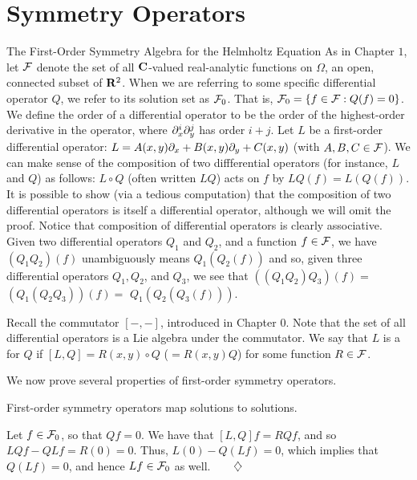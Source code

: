 \chapter{Symmetry Operators}

\begin{section}{The First-Order Symmetry Algebra for the Helmholtz Equation}
As in Chapter $1$, let $\mathcal{F}$ denote the set of all $\mathbf{C}$-valued real-analytic functions on $\Omega$, an open, connected subset of $\mathbf{R}^2$.  When we are referring to some specific differential operator $Q$, we refer to its solution set as $\mathcal{F}_0$.  That is, $\mathcal{F}_0 = \{ f \in \mathcal{F}: Q(f) = 0 \}$.  We define the order of a differential operator to be the order of the highest-order derivative in the operator, where $\partial_{x}^i \partial_{y}^j$ has order $i + j$.  Let $L$ be a first-order differential operator: $L = A(x,y) \partial_{x} + B(x,y) \partial_{y} + C(x,y)$ (with $A, B, C \in \mathcal{F}$).  We can make sense of the composition of two diffferential operators (for instance, $L$ and $Q$) as follows: $L \circ Q$ (often written $LQ$) acts on $f$ by $LQ(f) = L(Q(f))$.  It is possible to show (via a tedious computation) that the composition of two differential operators is itself a differential operator, although we will omit the proof.  Notice that composition of differential operators is clearly associative.  Given two differential operators $Q_1$ and $Q_2$, and a function $f \in \mathcal{F}$, we have $\left( Q_1 Q_2 \right) (f)$ unambiguously means $Q_1 \left( Q_2 (f) \right)$ and so, given three differential operators $Q_1, Q_2$, and $Q_3$, we see that $\left( \left( Q_1 Q_2 \right) Q_3 \right) (f) =$ $\left( Q_1 \left( Q_2 Q_3 \right) \right) (f) =$ $Q_1 \left( Q_2 \left( Q_3 (f) \right) \right)$.

Recall the commutator $[-,-]$, introduced in Chapter $0$.  Note that the set of all differential operators is a Lie algebra under the commutator.  We say that $L$ is a  for $Q$ if $[L, Q] = R(x,y) \circ Q$ ($= R(x,y)Q$) for some function $R \in \mathcal{F}$.

We now prove several properties of first-order symmetry operators.

\begin{theorem}
First-order symmetry operators map solutions to solutions.
\end{theorem}

\proof
Let $f \in \mathcal{F}_0$, so that $Qf = 0$.  We have that $[L, Q]f = R Q f$, and so $L Q f - Q L f = R (0) = 0$.  Thus, $L (0) - Q (L f) = 0$, which implies that $Q (L f) = 0$, and hence $L f \in \mathcal{F}_0$ as well.$\qquad \diamondsuit$


\end{section}
